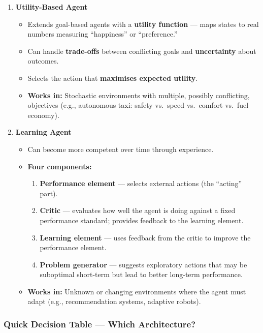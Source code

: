 \documentclass[12pt, a4paper]{article}
\begin{document}
\begin{enumerate}[leftmargin=1.2cm, itemsep=6pt]
  \item \textbf{Utility-Based Agent}
  \begin{itemize}[noitemsep]
    \item Extends goal-based agents with a \textbf{utility function} — maps states to real numbers measuring ``happiness'' or ``preference.''
    \item Can handle \textbf{trade-offs} between conflicting goals and \textbf{uncertainty} about outcomes.
    \item Selects the action that \textbf{maximises expected utility}.
    \item \textbf{Works in:} Stochastic environments with multiple, possibly conflicting, objectives (e.g., autonomous taxi: safety vs.\ speed vs.\ comfort vs.\ fuel economy).
  \end{itemize}

  \item \textbf{Learning Agent}
  \begin{itemize}[noitemsep]
    \item Can become more competent over time through experience.
    \item \textbf{Four components:}
    \begin{enumerate}[noitemsep]
      \item \textbf{Performance element} — selects external actions (the ``acting'' part).
      \item \textbf{Critic} — evaluates how well the agent is doing against a fixed performance standard; provides feedback to the learning element.
      \item \textbf{Learning element} — uses feedback from the critic to improve the performance element.
      \item \textbf{Problem generator} — suggests exploratory actions that may be suboptimal short-term but lead to better long-term performance.
    \end{enumerate}
    \item \textbf{Works in:} Unknown or changing environments where the agent must adapt (e.g., recommendation systems, adaptive robots).
  \end{itemize}

\end{enumerate}

\subsubsection*{Quick Decision Table — Which Architecture?}
\end{document}
